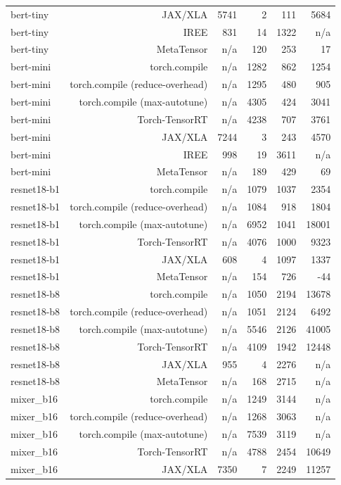 \begin{tabular}{lrrrrr}
bert-tiny & JAX/XLA & 5741 & 2 & 111 & 5684 \\
bert-tiny & IREE & 831 & 14 & 1322 & n/a \\
bert-tiny & MetaTensor & n/a & 120 & 253 & 17 \\
bert-mini & torch.compile & n/a & 1282 & 862 & 1254 \\
bert-mini & torch.compile (reduce-overhead) & n/a & 1295 & 480 & 905 \\
bert-mini & torch.compile (max-autotune) & n/a & 4305 & 424 & 3041 \\
bert-mini & Torch-TensorRT & n/a & 4238 & 707 & 3761 \\
bert-mini & JAX/XLA & 7244 & 3 & 243 & 4570 \\
bert-mini & IREE & 998 & 19 & 3611 & n/a \\
bert-mini & MetaTensor & n/a & 189 & 429 & 69 \\
resnet18-b1 & torch.compile & n/a & 1079 & 1037 & 2354 \\
resnet18-b1 & torch.compile (reduce-overhead) & n/a & 1084 & 918 & 1804 \\
resnet18-b1 & torch.compile (max-autotune) & n/a & 6952 & 1041 & 18001 \\
resnet18-b1 & Torch-TensorRT & n/a & 4076 & 1000 & 9323 \\
resnet18-b1 & JAX/XLA & 608 & 4 & 1097 & 1337 \\
resnet18-b1 & MetaTensor & n/a & 154 & 726 & -44 \\
resnet18-b8 & torch.compile & n/a & 1050 & 2194 & 13678 \\
resnet18-b8 & torch.compile (reduce-overhead) & n/a & 1051 & 2124 & 6492 \\
resnet18-b8 & torch.compile (max-autotune) & n/a & 5546 & 2126 & 41005 \\
resnet18-b8 & Torch-TensorRT & n/a & 4109 & 1942 & 12448 \\
resnet18-b8 & JAX/XLA & 955 & 4 & 2276 & n/a \\
resnet18-b8 & MetaTensor & n/a & 168 & 2715 & n/a \\
mixer\_b16 & torch.compile & n/a & 1249 & 3144 & n/a \\
mixer\_b16 & torch.compile (reduce-overhead) & n/a & 1268 & 3063 & n/a \\
mixer\_b16 & torch.compile (max-autotune) & n/a & 7539 & 3119 & n/a \\
mixer\_b16 & Torch-TensorRT & n/a & 4788 & 2454 & 10649 \\
mixer\_b16 & JAX/XLA & 7350 & 7 & 2249 & 11257 \\

\end{tabular}
